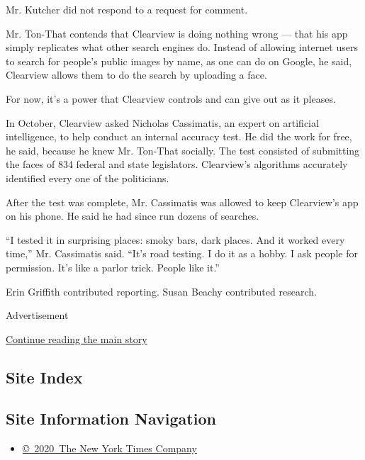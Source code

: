 Mr. Kutcher did not respond to a request for comment.

Mr. Ton-That contends that Clearview is doing nothing wrong --- that his
app simply replicates what other search engines do. Instead of allowing
internet users to search for people's public images by name, as one can
do on Google, he said, Clearview allows them to do the search by
uploading a face.

For now, it's a power that Clearview controls and can give out as it
pleases.

In October, Clearview asked Nicholas Cassimatis, an expert on artificial
intelligence, to help conduct an internal accuracy test. He did the work
for free, he said, because he knew Mr. Ton-That socially. The test
consisted of submitting the faces of 834 federal and state legislators.
Clearview's algorithms accurately identified every one of the
politicians.

After the test was complete, Mr. Cassimatis was allowed to keep
Clearview's app on his phone. He said he had since run dozens of
searches.

``I tested it in surprising places: smoky bars, dark places. And it
worked every time,'' Mr. Cassimatis said. ``It's road testing. I do it
as a hobby. I ask people for permission. It's like a parlor trick.
People like it.''

Erin Griffith contributed reporting. Susan Beachy contributed research.

Advertisement

\protect\hyperlink{after-bottom}{Continue reading the main story}

\hypertarget{site-index}{%
\subsection{Site Index}\label{site-index}}

\hypertarget{site-information-navigation}{%
\subsection{Site Information
Navigation}\label{site-information-navigation}}

\begin{itemize}
\tightlist
\item
  \href{https://help.nytimes.com/hc/en-us/articles/115014792127-Copyright-notice}{©~2020~The
  New York Times Company}
\end{itemize}

